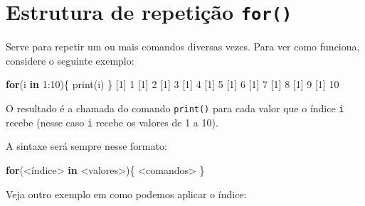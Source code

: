 \documentclass[
  10pt,
  a4paper]{book}
\newenvironment{Shaded}{\begin{snugshade}}{\end{snugshade}}
\newcommand{\ControlFlowTok}[1]{\textcolor[rgb]{0.13,0.29,0.53}{\textbf{#1}}}
\newcommand{\DecValTok}[1]{\textcolor[rgb]{0.00,0.00,0.81}{#1}}
\newcommand{\FunctionTok}[1]{\textcolor[rgb]{0.00,0.00,0.00}{#1}}
\newcommand{\NormalTok}[1]{#1}
\newcommand{\SpecialCharTok}[1]{\textcolor[rgb]{0.00,0.00,0.00}{#1}}
\begin{document}
\hypertarget{estrutura-de-repetiuxe7uxe3o-for}{%
\section{\texorpdfstring{Estrutura de repetição \texttt{for()}}{Estrutura de repetição for()}}\label{estrutura-de-repetiuxe7uxe3o-for}}

Serve para repetir um ou mais comandos diversas vezes. Para ver como
funciona, considere o seguinte exemplo:

\begin{Shaded}
\begin{Highlighting}[]
\ControlFlowTok{for}\NormalTok{(i }\ControlFlowTok{in} \DecValTok{1}\SpecialCharTok{:}\DecValTok{10}\NormalTok{)\{}
    \FunctionTok{print}\NormalTok{(i)}
\NormalTok{\}}
\NormalTok{[}\DecValTok{1}\NormalTok{] }\DecValTok{1}
\NormalTok{[}\DecValTok{1}\NormalTok{] }\DecValTok{2}
\NormalTok{[}\DecValTok{1}\NormalTok{] }\DecValTok{3}
\NormalTok{[}\DecValTok{1}\NormalTok{] }\DecValTok{4}
\NormalTok{[}\DecValTok{1}\NormalTok{] }\DecValTok{5}
\NormalTok{[}\DecValTok{1}\NormalTok{] }\DecValTok{6}
\NormalTok{[}\DecValTok{1}\NormalTok{] }\DecValTok{7}
\NormalTok{[}\DecValTok{1}\NormalTok{] }\DecValTok{8}
\NormalTok{[}\DecValTok{1}\NormalTok{] }\DecValTok{9}
\NormalTok{[}\DecValTok{1}\NormalTok{] }\DecValTok{10}
\end{Highlighting}
\end{Shaded}

O resultado é a chamada do comando \texttt{print()} para cada valor que o
índice \texttt{i} recebe (nesse caso \texttt{i} recebe os valores de 1 a 10).

A sintaxe será sempre nesse formato:

\begin{Shaded}
\begin{Highlighting}[]
\ControlFlowTok{for}\NormalTok{(}\SpecialCharTok{\textless{}}\NormalTok{índice}\SpecialCharTok{\textgreater{}} \ControlFlowTok{in} \SpecialCharTok{\textless{}}\NormalTok{valores}\SpecialCharTok{\textgreater{}}\NormalTok{)\{}
    \SpecialCharTok{\textless{}}\NormalTok{comandos}\SpecialCharTok{\textgreater{}}
\NormalTok{\}}
\end{Highlighting}
\end{Shaded}

Veja outro exemplo em como podemos aplicar o índice:
\end{document}
